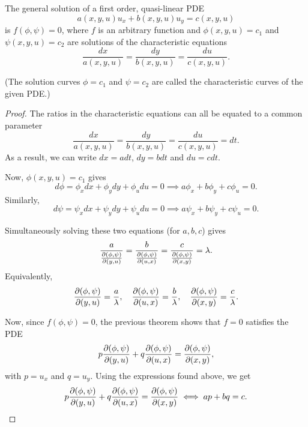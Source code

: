 \documentclass[11pt]{penrose}
\begin{document}
\begin{nthm}
    The general solution of a first order, quasi-linear PDE
    \begin{equation}
        a(x,y,u) u_x + b(x,y,u) u_y = c(x,y,u)
    \end{equation}
    is $f(\phi, \psi) = 0$, where $f$ is an arbitrary function and $\phi(x,y,u)=c_1$ and $\psi(x,y,u)=c_2$ are solutions of the characteristic equations
    \begin{equation}
        \frac{dx}{a(x,y,u)} = \frac{dy}{b(x,y,u)} = \frac{du}{c(x,y,u)}.
    \end{equation}

    (The solution curves $\phi = c_1$ and $\psi = c_2$ are called the characteristic curves of the given PDE.)
\end{nthm}
\begin{proof}
    The ratios in the characteristic equations can all be equated to a common parameter
    \begin{equation}
        \frac{dx}{a(x,y,u)} = \frac{dy}{b(x,y,u)} = \frac{du}{c(x,y,u)} = dt.
    \end{equation}
    As a result, we can write $dx = a dt$, $dy = b dt$ and $du = c dt$.

    Now, $\phi(x,y,u) = c_1$ gives
    \begin{equation}
        d\phi = \phi_x dx + \phi_y dy + \phi_u du = 0
        \implies a \phi_x + b \phi_y + c \phi_u = 0.
    \end{equation}
    Similarly,
    \begin{equation}
        d\psi = \psi_x dx + \psi_y dy + \psi_u du = 0
        \implies a \psi_x + b \psi_y + c \psi_u = 0.
    \end{equation}

    Simultaneously solving these two equations (for $a, b, c$) gives
    \begin{equation}
        \frac{a}{\frac{\partial(\phi, \psi)}{\partial(y,u)}} = \frac{b}{\frac{\partial(\phi, \psi)}{\partial(u,x)}} = \frac{c}{\frac{\partial(\phi, \psi)}{\partial(x,y)}} = \lambda.
    \end{equation}
    Equivalently,
    \begin{equation}
        \frac{\partial(\phi, \psi)}{\partial(y,u)} = \frac{a}{\lambda}, \quad
        \frac{\partial(\phi, \psi)}{\partial(u,x)} = \frac{b}{\lambda}, \quad
        \frac{\partial(\phi, \psi)}{\partial(x,y)} = \frac{c}{\lambda}.
    \end{equation}

    Now, since $f(\phi, \psi) = 0$, the previous theorem shows that $f = 0$ satisfies the PDE
    \begin{equation}
        p \frac{\partial(\phi, \psi)}{\partial(y,u)}
        + q \frac{\partial(\phi, \psi)}{\partial(u,x)}
        = \frac{\partial(\phi, \psi)}{\partial(x,y)},
    \end{equation}
    with $p = u_x$ and $q = u_y$. Using the expressions found above, we get
    \begin{equation}
        p \frac{\partial(\phi, \psi)}{\partial(y,u)}
        + q \frac{\partial(\phi, \psi)}{\partial(u,x)}
        = \frac{\partial(\phi, \psi)}{\partial(x,y)}
        \iff
        a p + b q = c.
    \end{equation}


\end{proof}
\end{document}
